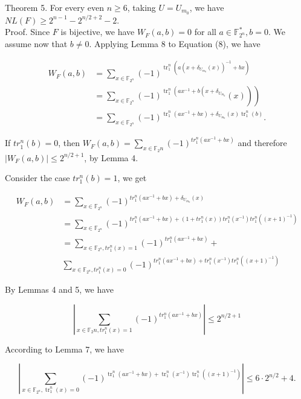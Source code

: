 \documentclass[10pt]{article}
\begin{document}
Theorem 5. For every even $n \geq 6$, taking $U=U_{m_{0}}$, we have $N L(F) \geq 2^{n-1}-2^{n / 2+2}-2$.\\
Proof. Since $F$ is bijective, we have $W_{F}(a, b)=0$ for all $a \in \mathbb{F}_{2^{n}}^{*}, b=0$. We assume now that $b \neq 0$. Applying Lemma 8 to Equation (8), we have

$$
\begin{aligned}
W_{F}(a, b) & =\sum_{x \in \mathbb{F}_{2^{n}}}(-1)^{\operatorname{tr}_{1}^{n}\left(a\left(x+\delta_{U_{m_{0}}}(x)\right)^{-1}+b x\right)} \\
& \left.\left.=\sum_{x \in \mathbb{F}_{2^{n}}}(-1)^{\operatorname{tr}_{1}^{n}\left(a x^{-1}+b\left(x+\delta_{U_{m_{0}}}\right.\right.}(x)\right)\right) \\
& =\sum_{x \in \mathbb{F}_{2^{n}}}(-1)^{\operatorname{tr}_{1}^{n}\left(a x^{-1}+b x\right)+\delta_{U_{m_{0}}}(x) \operatorname{tr}_{1}^{n}(b)} .
\end{aligned}
$$

If $t r_{1}^{n}(b)=0$, then $W_{F}(a, b)=\sum_{x \in \mathbb{F}_{2} n}(-1)^{t r_{1}^{n}\left(a x^{-1}+b x\right)}$ and therefore $\left|W_{F}(a, b)\right| \leq 2^{n / 2+1}$, by Lemma 4.

Consider the case $t r_{1}^{n}(b)=1$, we get

$$
\begin{aligned}
W_{F}(a, b) & =\sum_{x \in \mathbb{F}_{2^{n}}}(-1)^{t r_{1}^{n}\left(a x^{-1}+b x\right)+\delta_{U_{m_{0}}}(x)} \\
& =\sum_{x \in \mathbb{F}_{2^{n}}}(-1)^{t r_{1}^{n}\left(a x^{-1}+b x\right)+\left(1+t r_{1}^{n}(x)\right) t r_{1}^{n}\left(x^{-1}\right) t r_{1}^{n}\left((x+1)^{-1}\right)} \\
& =\sum_{x \in \mathbb{F}_{2^{n}}, t r_{1}^{n}(x)=1}(-1)^{t r_{1}^{n}\left(a x^{-1}+b x\right)}+ \\
& \sum_{x \in \mathbb{F}_{2^{n}}, t r_{1}^{n}(x)=0}(-1)^{t r_{1}^{n}\left(a x^{-1}+b x\right)+t r_{1}^{n}\left(x^{-1}\right) t r_{1}^{n}\left((x+1)^{-1}\right)}
\end{aligned}
$$

By Lemmas 4 and 5, we have

$$
\left|\sum_{x \in \mathbb{F}_{2} n, t r_{1}^{n}(x)=1}(-1)^{t r_{1}^{n}\left(a x^{-1}+b x\right)}\right| \leq 2^{n / 2+1}
$$

According to Lemma 7, we have

$$
\left|\sum_{x \in \mathbb{F}_{2^{n}}, \operatorname{tr}_{1}^{n}(x)=0}(-1)^{\operatorname{tr}_{1}^{n}\left(a x^{-1}+b x\right)+\operatorname{tr}_{1}^{n}\left(x^{-1}\right) \operatorname{tr}_{1}^{n}\left((x+1)^{-1}\right)}\right| \leq 6 \cdot 2^{n / 2}+4 .
$$
\end{document}
